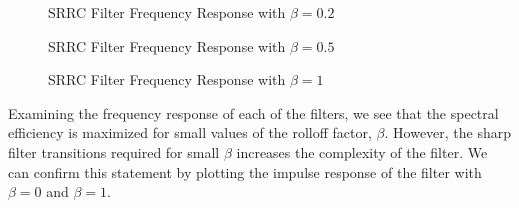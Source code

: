 \documentclass{article}
\begin{document}
\begin{figure}[H]
	\centerline{}
	\caption{SRRC Filter Frequency Response with $\beta=0.2$}
	\label{fig::srrc_freq_response_beta_0_2}
\end{figure}

\begin{figure}[H]
	\centerline{}
	\caption{SRRC Filter Frequency Response with $\beta=0.5$}
	\label{fig::srrc_freq_response_beta_0_5}
\end{figure}

\begin{figure}[H]
	\centerline{}
	\caption{SRRC Filter Frequency Response with $\beta=1$}
	\label{fig::srrc_freq_response_beta_1}
\end{figure}

\noindent Examining the frequency response of each of the filters, we see that the spectral efficiency is maximized for small values of the rolloff factor, $\beta$. However, the sharp filter transitions required for small $\beta$ increases the complexity of the filter. We can confirm this statement by plotting the impulse response of the filter with $\beta=0$ and $\beta=1$.
\end{document}
